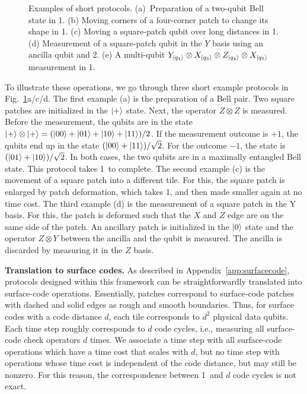 \documentclass[prx,aps,letterpaper,twocolumn,allowfontchageintitle=true,accepted=2019-02-01]{quantumarticle}
\begin{document}
\begin{figure}[t]
\centering
\def\svgwidth{\linewidth}

\caption{Examples of short protocols. (a)~Preparation of a two-qubit Bell state in 1\clock. (b) Moving corners of a four-corner patch to change its shape in 1\clock. (c) Moving a square-patch qubit over long distances in 1\clock. (d) Measurement of a square-patch qubit in the $Y$ basis using an ancilla qubit and 2\clock.  (e) A multi-qubit  $Y_{\ket{q_1}}\otimes X_{\ket{q_3}} \otimes Z_{\ket{q_4}} \otimes X_{\ket{q_5}}$ measurement in 1\clock. }
\label{fig:operations}
\end{figure}



To illustrate these operations, we go through three short example protocols in Fig.~\ref{fig:operations}a/c/d. The first example (a) is the preparation of a Bell pair. Two square patches are initialized in the $\ket{+}$ state. Next, the operator $Z\otimes Z$ is measured. Before the measurement, the qubits are in the state $\ket{+} \otimes \ket{+} = (\ket{00} + \ket{01} + \ket{10} + \ket{11})/2$. If the measurement outcome is $+1$, the qubits end up in the state $(\ket{00} + \ket{11})/\sqrt{2}$. For the outcome $-1$, the state is $(\ket{01} + \ket{10})/\sqrt{2}$. In both cases, the two qubits are in a maximally entangled Bell state. This protocol takes 1\clock \ to complete. The second example (c) is the movement of a square patch into a different tile. For this, the square patch is enlarged by patch deformation, which takes 1\clock, and then made smaller again at no time cost.
The third example (d) is the measurement of a square patch in the Y basis. For this, the patch is deformed such that the $X$ and $Z$ edge are on the same side of the patch. An ancillary patch is initialized in the $\ket{0}$ state and the operator $Z \otimes Y$ between the ancilla and the qubit is measured. The ancilla is discarded by measuring it in the $Z$ basis.



\textbf{Translation to surface codes.} As described in Appendix~\ref{app:surfacecode}, protocols designed within this framework can be straightforwardly translated into surface-code operations. Essentially, patches correspond to surface-code patches with dashed and solid edges as rough and smooth boundaries. Thus, for surface codes with a code distance $d$, each tile corresponds to $d^2$ physical data qubits. Each time step roughly corresponds to $d$ code cycles, i.e., measuring all surface-code check operators $d$ times. We associate a time step with all surface-code operations which have a time cost that scales with $d$, but no time step with operations whose time cost is independent of the code distance, but may still be nonzero. For this reason, the correspondence between 1\clock \ and $d$ code cycles is not exact. 
\end{document}
